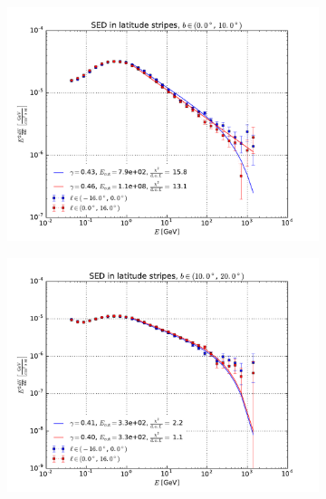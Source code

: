 \documentclass[a4paper]{article}
\begin{document}
\begin{figure}
    \begin{subfigure}{0.5\textwidth}
        \includegraphics[width=\textwidth]{spectrum_of_top_bubble_in_lat_stripes_0-10.pdf}
    \end{subfigure} 
    \begin{subfigure}{0.5\textwidth}
        \includegraphics[width=\textwidth]{spectrum_of_top_bubble_in_lat_stripes_10-20.pdf}
    \end{subfigure}
    \begin{subfigure}{0.5\textwidth}

\end{subfigure}
\end{figure}
\end{document}
